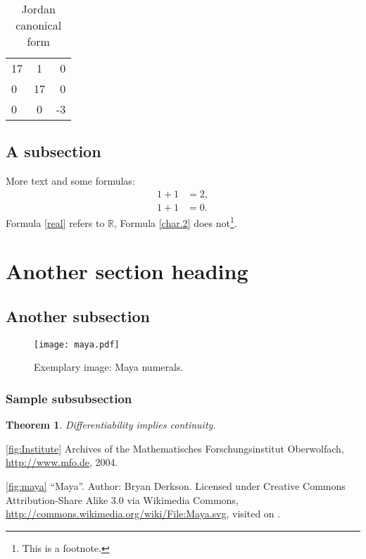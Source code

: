 \documentclass{snapshotmfo}
\begin{document}
\begin{table}[ht]
	\caption{Jordan canonical form}
	\begin{tabular}{ l c r }
		17 & 1 & 0 \\
		0 & 17 & 0 \\
		0 & 0 & -3 \\
	\end{tabular}
	\label{tab:Jordan}
\end{table}

\subsection{A subsection}
\label{subsec:first}
More text and some formulas:
\begin{align}\label{real}
	1+1&=2,\\\label{char.2}
	1+1&=0.
\end{align}
Formula \eqref{real} refers to $\mathbb{R}$, Formula \eqref{char.2} does not\footnote{This is a footnote.\label{footnote}}.


\section{Another section heading}
\label{sec:another}

\subsection{Another subsection} \label{subsec:another}

\begin{figure}[ht]
	\centering
	\texttt{[image: maya.pdf]}
	\caption{Exemplary image: Maya numerals.}
	\label{fig:maya}
\end{figure}

\subsubsection{Sample subsubsection} \label{subsubsec:sample}

\newtheorem{theorem}{Theorem}
\begin{theorem}\label{thm:continuity}
	Differentiability implies continuity.
\end{theorem}



\begin{imagecredits}
	\item[\autoref{fig:Institute}] Archives of the Mathematisches Forschungsinstitut Oberwolfach,\\\url{http://www.mfo.de}, 2004.
	\item[\autoref{fig:maya}] ``Maya''. Author: Bryan Derkson. Licensed under Creative Commons Attribution-Share Alike 3.0 via Wikimedia Commons, \url{http://commons.wikimedia.org/wiki/File:Maya.svg}, visited on .
\end{imagecredits}
\end{document}
